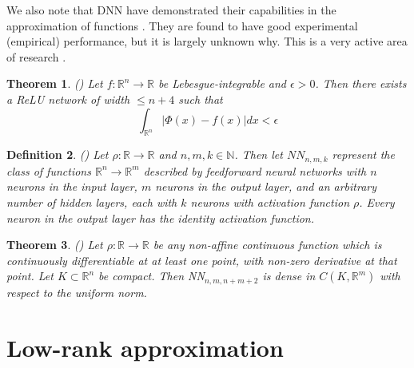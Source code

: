 \documentclass{article}
\newtheorem{theorem}{Theorem}
\newtheorem{definition}[theorem]{Definition}
\begin{document}
We also note that DNN have demonstrated their capabilities in the approximation of functions \citep{liang2016deep,yarotsky2017error,fan2020universal}. They are found to have good experimental (empirical) performance, but it is largely unknown why. This is a very active area of research \cite{caterini2018deep}.

\begin{theorem}
(\cite{lu2017expressive}) Let  $f:\mathbb{R}^{n}\rightarrow\mathbb{R}$ be Lebesgue-integrable and $\epsilon>0$. Then there exists a ReLU
network of width $\leq n+4$ such that
\[
\int_{\mathbb{R}^{n}}\left\vert \Phi\left(  x\right)  -f\left(  x\right)  \right\vert dx<\epsilon
\]

\end{theorem}

\begin{definition}
(\cite{kidger2020universal}) Let $\rho:\mathbb{R}\rightarrow\mathbb{R}$ and $n,m,k\in\mathbb{N}$. Then let $NN_{n,m,k}$ represent the class of functions $\mathbb{R}^{n}\rightarrow\mathbb{R}^{m}$ described by feedforward neural networks with $n$ neurons in the input layer, $m$ neurons in the output layer, and an arbitrary number of hidden layers, each with $k$ neurons with activation function $\rho$. Every neuron in the output layer has the identity activation function.
\end{definition}

\begin{theorem}
(\cite{kidger2020universal}) Let $\rho:\mathbb{R}\rightarrow\mathbb{R}$ be any non-affine continuous function which is continuously differentiable at
at least one point, with non-zero derivative at that point. Let $K\subset\mathbb{R}^{n}$ be compact. Then NN$_{n,m,n+m+2}$ is dense in $C\left(  K,\mathbb{R}^{m}\right)$ with respect to the uniform norm.
\end{theorem}


\section{Low-rank approximation}
\end{document}
